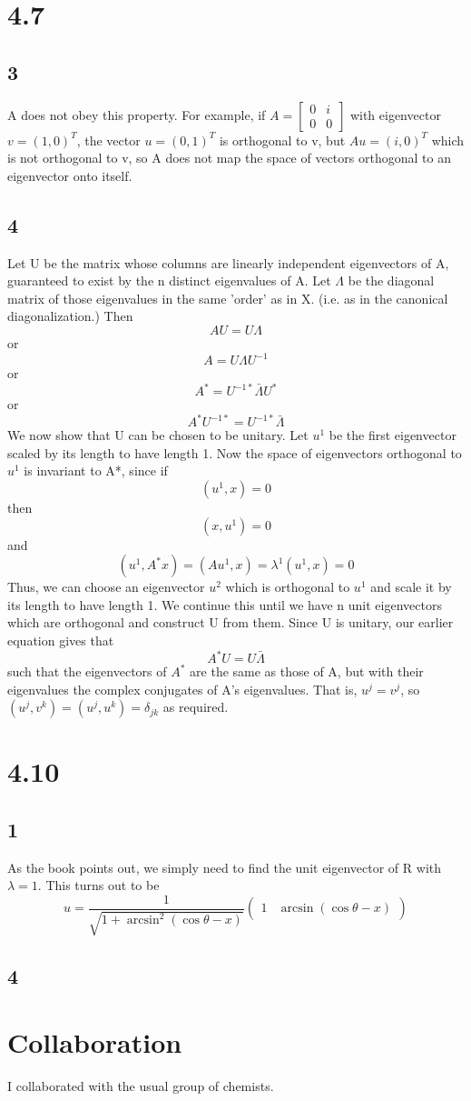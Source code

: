 \documentclass{article}
\begin{document}
\section*{4.7}
\subsection*{3}
A does not obey this property.  For example, if $A = \begin{bmatrix}0&i\\0&0\end{bmatrix}$ with eigenvector $v = (1,0)^T$, the vector $u = (0,1)^T$ is orthogonal to v, but $Au = (i, 0)^T$ which is not orthogonal to v, so A does not map the space of vectors orthogonal to an eigenvector onto itself.
\subsection*{4}
Let U be the matrix whose columns are linearly independent eigenvectors of A, guaranteed to exist by the n distinct eigenvalues of A.  Let $\Lambda$ be the diagonal matrix of those eigenvalues in the same 'order' as in X.  (i.e. as in the canonical diagonalization.)  Then 
$$AU = U\Lambda$$
or
$$A = U\Lambda U^{-1}$$
or
$$A^* = U^{-1*}\bar{\Lambda}U^{*}$$
or
$$A^{*}U^{-1*} = U^{-1*}\bar{\Lambda}$$
We now show that U can be chosen to be unitary.  Let $u^1$ be the first eigenvector scaled by its length to have length 1.  Now the space of eigenvectors orthogonal to $u^1$ is invariant to A*, since if 
$$(u^1,x) = 0$$
then
$$(x,u^1) = 0$$
and
$$(u^1,A^*x) = (Au^1,x)=\lambda^1(u^1,x) = 0$$
Thus, we can choose an eigenvector $u^2$ which is orthogonal to $u^1$ and scale it by its length to have length 1.  We continue this until we have n unit eigenvectors which are orthogonal and construct U from them.  Since U is unitary, our earlier equation gives that
$$A^*U = U\bar{\Lambda}$$
such that the eigenvectors of $A^*$ are the same as those of A, but with their eigenvalues the complex conjugates of A's eigenvalues.  That is, $u^j = v^j$, so $(u^j,v^k)=(u^j,u^k)=\delta_{jk}$ as required. 
\section*{4.10}
\subsection*{1}
As the book points out, we simply need to find the unit eigenvector of R with $\lambda = 1$.  This turns out to be
$$u = \frac{1}{\sqrt{1+\arcsin^2(\cos\theta-x)}}\begin{pmatrix}1&\arcsin(\cos\theta-x)\end{pmatrix}$$ 
\subsection*{4}

\section*{Collaboration}
I collaborated with the usual group of chemists.
\end{document}
